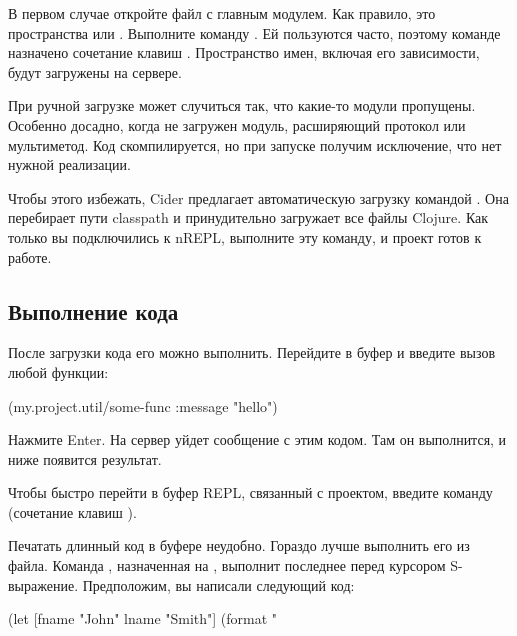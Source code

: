 В первом случае откройте файл с главным модулем. Как правило, это пространства  или . Выполните команду . Ей пользуются часто, поэтому команде назначено сочетание клавиш . Пространство имен, включая его зависимости, будут загружены на сервере.

При ручной загрузке может случиться так, что какие-то модули пропущены. Особенно досадно, когда не загружен модуль, расширяющий протокол или мультиметод. Код скомпилируется, но при запуске получим исключение, что нет нужной реализации.

Чтобы этого избежать, Cider предлагает автоматическую загрузку командой . Она перебирает пути classpath и принудительно загружает все файлы Clojure. Как только вы подключились к nREPL, выполните эту команду, и проект готов к работе.

\subsection{Выполнение кода}

После загрузки кода его можно выполнить. Перейдите в буфер  и введите вызов любой функции:

\begin{english}
  \begin{clojure}
(my.project.util/some-func {:message "hello"})
  \end{clojure}
\end{english}

Нажмите Enter. На сервер уйдет сообщение с этим кодом. Там он выполнится, и ниже появится результат.

Чтобы быстро перейти в буфер REPL, связанный с проектом, введите команду  (сочетание клавиш ).

Печатать длинный код в буфере  неудобно. Гораздо лучше выполнить его из файла. Команда , назначенная на , выполнит последнее перед курсором S-выражение. Предположим, вы написали следующий код:

\begin{english}
  \begin{clojure}
(let [fname "John"
      lname "Smith"]
  (format "%
  \end{clojure}
\end{english}

